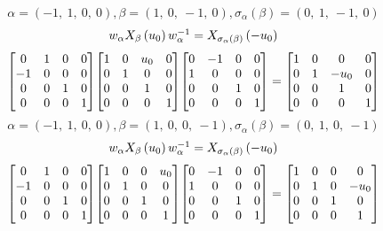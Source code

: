 \documentclass[11pt]{article}
\theoremstyle{definition}
\begin{document}
\[
\alpha = \left( -1, \  1, \  0, \  0\right), \beta = \left( 1, \  0, \  -1, \  0\right), \sigma_{\alpha}(\beta) = \left( 0, \  1, \  -1, \  0\right)
\]
\[
\scaletoalign{\textwidth}{w_{\alpha} X_{\beta}\left(u_{0}\right) w_{\alpha}^{-1} = X_{\sigma_{\alpha}\left(\beta\right)}\left(- u_{0}\right)}
\]
\[
\scaletoalign{\textwidth}{{\left[\begin{matrix}0 & 1 & 0 & 0\\-1 & 0 & 0 & 0\\0 & 0 & 1 & 0\\0 & 0 & 0 & 1\end{matrix}\right]} {\left[\begin{matrix}1 & 0 & u_{0} & 0\\0 & 1 & 0 & 0\\0 & 0 & 1 & 0\\0 & 0 & 0 & 1\end{matrix}\right]} {\left[\begin{matrix}0 & -1 & 0 & 0\\1 & 0 & 0 & 0\\0 & 0 & 1 & 0\\0 & 0 & 0 & 1\end{matrix}\right]} = {\left[\begin{matrix}1 & 0 & 0 & 0\\0 & 1 & - u_{0} & 0\\0 & 0 & 1 & 0\\0 & 0 & 0 & 1\end{matrix}\right]}}
\]
\[
\alpha = \left( -1, \  1, \  0, \  0\right), \beta = \left( 1, \  0, \  0, \  -1\right), \sigma_{\alpha}(\beta) = \left( 0, \  1, \  0, \  -1\right)
\]
\[
\scaletoalign{\textwidth}{w_{\alpha} X_{\beta}\left(u_{0}\right) w_{\alpha}^{-1} = X_{\sigma_{\alpha}\left(\beta\right)}\left(- u_{0}\right)}
\]
\[
\scaletoalign{\textwidth}{{\left[\begin{matrix}0 & 1 & 0 & 0\\-1 & 0 & 0 & 0\\0 & 0 & 1 & 0\\0 & 0 & 0 & 1\end{matrix}\right]} {\left[\begin{matrix}1 & 0 & 0 & u_{0}\\0 & 1 & 0 & 0\\0 & 0 & 1 & 0\\0 & 0 & 0 & 1\end{matrix}\right]} {\left[\begin{matrix}0 & -1 & 0 & 0\\1 & 0 & 0 & 0\\0 & 0 & 1 & 0\\0 & 0 & 0 & 1\end{matrix}\right]} = {\left[\begin{matrix}1 & 0 & 0 & 0\\0 & 1 & 0 & - u_{0}\\0 & 0 & 1 & 0\\0 & 0 & 0 & 1\end{matrix}\right]}}
\]
\end{document}
